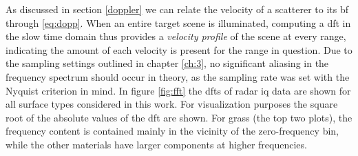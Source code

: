 As discussed in section \ref{doppler} we can relate the velocity of a scatterer to its \gls{bf} through \eqref{eq:dopp}. When an entire target scene is illuminated, computing a \gls{dft} in the slow time domain thus provides a \emph{velocity profile} of the scene at every range, indicating the amount of each velocity is present for the range in question. Due to the sampling settings outlined in chapter \ref{ch:3}, no significant aliasing in the frequency spectrum should occur in theory, as the sampling rate was set with the Nyquist criterion in mind. In figure \ref{fig:fft} the \gls{dft}s of radar \gls{iq} data are shown for all surface types considered in this work. For visualization purposes the square root of the absolute values of the \gls{dft} are shown. For grass (the top two plots), the frequency content is contained mainly in the vicinity of the zero-frequency bin, while the other materials have larger components at higher frequencies. %





